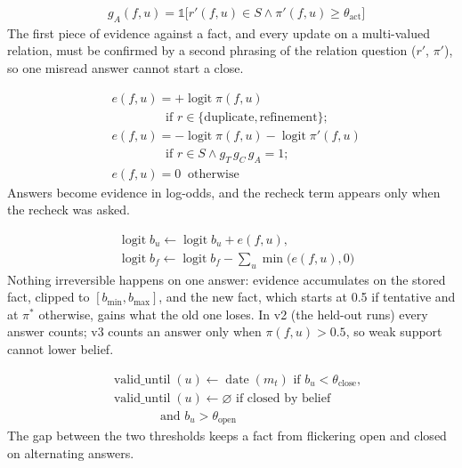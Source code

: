 \documentclass[11pt]{article}
\begin{document}
\begin{align}
& g_A(f,u) = \mathbb{1}\bigl[r'(f,u) \in S \wedge \pi'(f,u) \ge \theta_{\text{act}}\bigr] \label{eq:gagree}
\end{align}
The first piece of evidence against a fact, and every update on a multi-valued relation, must be confirmed by a second phrasing of the relation question ($r'$, $\pi'$), so one misread answer cannot start a close.

\begin{align}
& e(f,u) = +\operatorname{logit} \pi(f,u) \nonumber\\
& \qquad\qquad \text{ if } r \in \{\text{duplicate}, \text{refinement}\}; \nonumber\\
& e(f,u) = -\operatorname{logit} \pi(f,u) - \operatorname{logit} \pi'(f,u) \nonumber\\
& \qquad\qquad \text{ if } r \in S \wedge g_T\, g_C\, g_A = 1; \nonumber\\
& e(f,u) = 0 \ \text{ otherwise} \label{eq:evid}
\end{align}
Answers become evidence in log-odds, and the recheck term appears only when the recheck was asked.

\begin{align}
& \operatorname{logit} b_u \leftarrow \operatorname{logit} b_u + e(f,u), \nonumber\\
& \operatorname{logit} b_f \leftarrow \operatorname{logit} b_f - \textstyle\sum_{u} \min\bigl(e(f,u), 0\bigr) \label{eq:belief}
\end{align}
Nothing irreversible happens on one answer: evidence accumulates on the stored fact, clipped to $[b_{\min}, b_{\max}]$, and the new fact, which starts at 0.5 if tentative and at $\pi^{*}$ otherwise, gains what the old one loses. In v2 (the held-out runs) every answer counts; v3 counts an answer only when $\pi(f,u) > 0.5$, so weak support cannot lower belief.

\begin{align}
& \operatorname{valid\_until}(u) \leftarrow \operatorname{date}(m_t) \text{ if } b_u < \theta_{\text{close}}, \nonumber\\
& \operatorname{valid\_until}(u) \leftarrow \varnothing \text{ if closed by belief} \nonumber\\
& \qquad\qquad \text{and } b_u > \theta_{\text{open}} \label{eq:hyst}
\end{align}
The gap between the two thresholds keeps a fact from flickering open and closed on alternating answers.
\end{document}
